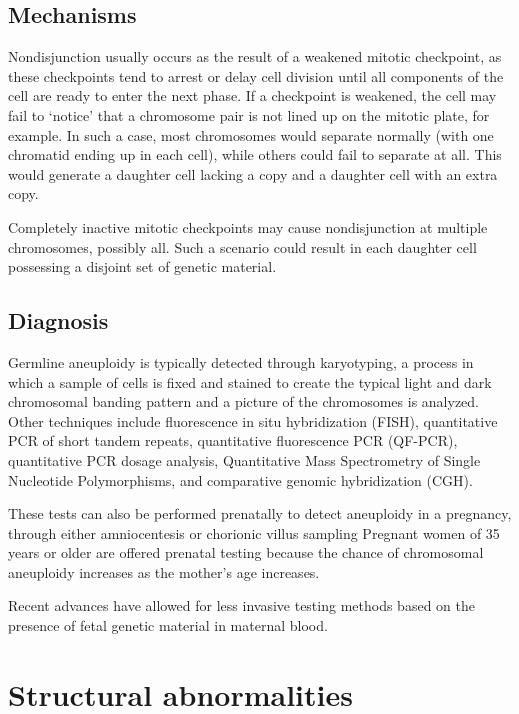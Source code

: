 \hypertarget{mechanisms}{%
\subsection{Mechanisms}\label{mechanisms}}

Nondisjunction usually occurs as the result of a weakened mitotic checkpoint, as these checkpoints tend to arrest or delay cell division until all components of the cell are ready to enter the next phase. If a checkpoint is weakened, the cell may fail to `notice' that a chromosome pair is not lined up on the mitotic plate, for example. In such a case, most chromosomes would separate normally (with one chromatid ending up in each cell), while others could fail to separate at all. This would generate a daughter cell lacking a copy and a daughter cell with an extra copy.

Completely inactive mitotic checkpoints may cause nondisjunction at multiple chromosomes, possibly all. Such a scenario could result in each daughter cell possessing a disjoint set of genetic material.

\hypertarget{diagnosis}{%
\subsection{Diagnosis}\label{diagnosis}}

Germline aneuploidy is typically detected through karyotyping, a process in which a sample of cells is fixed and stained to create the typical light and dark chromosomal banding pattern and a picture of the chromosomes is analyzed. Other techniques include fluorescence in situ hybridization (FISH), quantitative PCR of short tandem repeats, quantitative fluorescence PCR (QF-PCR), quantitative PCR dosage analysis, Quantitative Mass Spectrometry of Single Nucleotide Polymorphisms, and comparative genomic hybridization (CGH).

These tests can also be performed prenatally to detect aneuploidy in a pregnancy, through either amniocentesis or chorionic villus sampling Pregnant women of 35 years or older are offered prenatal testing because the chance of chromosomal aneuploidy increases as the mother's age increases.

Recent advances have allowed for less invasive testing methods based on the presence of fetal genetic material in maternal blood.

\hypertarget{structural-abnormalities}{%
\section{Structural abnormalities}\label{structural-abnormalities}}

